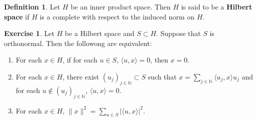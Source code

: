 \documentclass[12pt]{amsart}
\theoremstyle{definition}
\newtheorem{defn}[definition]{Definition}
\newtheorem{ex}[definition]{Exercise}
\newcommand{\N}{\mathbb{N}}
\renewcommand{\r}{\rangle}
\renewcommand{\l}{\langle}
\newcommand{\lex}[1]{\label{ex:#1}}
\newcommand{\ld}[1]{\label{defn:#1}}
\begin{document}
\begin{defn} \ld{}
	Let $H$ be an inner product space. Then $H$ is said to be a \textbf{Hilbert space} if $H$ is a complete with respect to the induced norm on $H$.
\end{defn}

\begin{ex} \lex{}
Let $H$ be a Hilbert space and $S \subset H$. Suppose that  $S$ is orthonormal. Then the followong are equivalent: 
\begin{enumerate}
\item For each $x \in H$, if for each $u \in S$, $\l u, x \r = 0$, then $x =0$.
\item For each $x \in H$, there exist $(u_j)_{j\in \N} \subset S$ such that $x = \sum\limits_{j \in \N} \l u_j, x\r u_j$ and for each $u \not \in (u_j)_{j\in \N}$, $\l u, x\r =0$.
\item For each $x \in H$, $\|x\|^2 = \sum\limits_{u \in S} | \l u, x \r |^2$.
\end{enumerate}
\end{ex}
\end{document}
